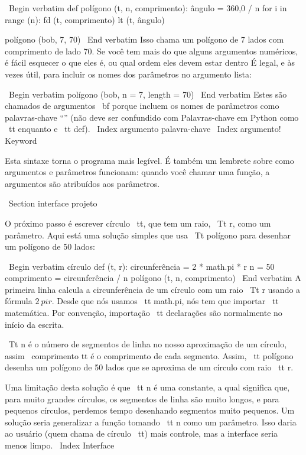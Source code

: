 \documentclass[10pt]{book}
\begin{document}
{\ Begin {verbatim}
def polígono (t, n, comprimento):
    ângulo = 360,0 / n
    for i in range (n):
        fd (t, comprimento)
        lt (t, ângulo)

polígono (bob, 7, 70)
\ End {verbatim}
%
Isso chama um polígono de 7 lados com comprimento de lado 70. Se você tem
mais do que alguns argumentos numéricos, é fácil esquecer o que eles
é, ou qual ordem eles devem estar dentro É legal, e às vezes
útil, para incluir os nomes dos parâmetros no argumento
lista:

\ Begin {verbatim}
polígono (bob, n = 7, length = 70)
\ End {verbatim}
%
Estes são chamados de argumentos {\ bf} porque incluem
os nomes de parâmetros como palavras-chave ``'' (não deve ser confundido com
Palavras-chave em Python como {\ tt enquanto} e {\ tt def}).
\ Index {argumento palavra-chave}
\ Index {argumento! Keyword}

Esta sintaxe torna o programa mais legível. É também um lembrete
sobre como argumentos e parâmetros funcionam: quando você chamar uma função, a
argumentos são atribuídos aos parâmetros.


\ Section {interface} projeto

O próximo passo é escrever {círculo \ tt}, que tem um raio,
{\ Tt r}, como um parâmetro. Aqui está uma solução simples que usa
{\ Tt polígono} para desenhar um polígono de 50 lados:

\ Begin {verbatim}
círculo def (t, r):
    circunferência = 2 * math.pi * r
    n = 50
    comprimento = circunferência / n
    polígono (t, n, comprimento)
\ End {verbatim}
%
A primeira linha calcula a circunferência de um círculo com um raio
{\ Tt r} usando a fórmula $ 2 \ pi r $. Desde que nós usamos {\ tt math.pi}, nós
tem que importar {\ tt matemática}. Por convenção, {importação \ tt} declarações
são normalmente no início da escrita.

{\ Tt n} é o número de segmentos de linha no nosso aproximação de um círculo,
assim {\ comprimento tt} é o comprimento de cada segmento. Assim, {\ tt polígono}
desenha um polígono de 50 lados que se aproxima de um círculo com raio {\ tt r}.

Uma limitação desta solução é que {\ tt n} é uma constante, a qual
significa que, para muito grandes círculos, os segmentos de linha são muito longos, e
para pequenos círculos, perdemos tempo desenhando segmentos muito pequenos. Um
solução seria generalizar a função tomando {\ tt n} como
um parâmetro. Isso daria ao usuário (quem chama de círculo {\ tt})
mais controle, mas a interface seria menos limpo.
\ Index {Interface}

}
\end{document}
